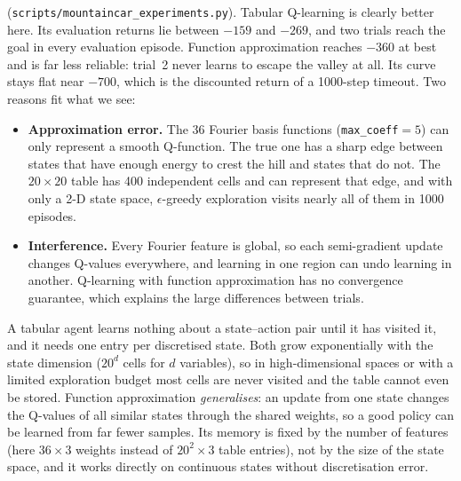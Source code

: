 \begin{solution}
(\texttt{scripts/mountaincar\_experiments.py}). Tabular Q-learning is clearly better here. Its evaluation returns
lie between $-159$ and $-269$, and two trials reach the goal in every evaluation episode. Function approximation
reaches $-360$ at best and is far less reliable: trial~2 never learns to escape the valley at all. Its curve stays
flat near $-700$, which is the discounted return of a 1000-step timeout. Two reasons fit what we see:
\begin{itemize}
  \item \textbf{Approximation error.} The 36 Fourier basis functions (\texttt{max\_coeff}$=5$) can only represent
  a smooth Q-function. The true one has a sharp edge between states that have enough energy to crest the hill and
  states that do not. The $20\times20$ table has 400 independent cells and can represent that edge, and with only a
  2-D state space, $\epsilon$-greedy exploration visits nearly all of them in 1000 episodes.
  \item \textbf{Interference.} Every Fourier feature is global, so each semi-gradient update changes Q-values
  everywhere, and learning in one region can undo learning in another. Q-learning with function approximation has
  no convergence guarantee, which explains the large differences between trials.
\end{itemize}
\end{solution}

\begin{solution}
A tabular agent learns nothing about a state--action pair until it has visited it, and it needs one entry per
discretised state. Both grow exponentially with the state dimension ($20^d$ cells for $d$ variables), so in
high-dimensional spaces or with a limited exploration budget most cells are never visited and the table
cannot even be stored. Function approximation \emph{generalises}: an update from one state changes the Q-values of
all similar states through the shared weights, so a good policy can be learned from far fewer samples. Its memory
is fixed by the number of features (here $36\times3$ weights instead of $20^2\times3$ table entries), not by the
size of the state space, and it works directly on continuous states without discretisation error.
\end{solution}

